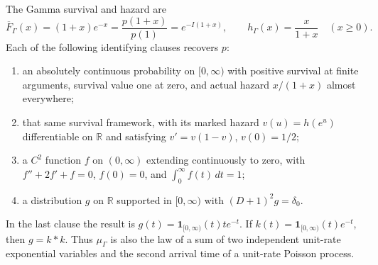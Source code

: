 \begin{theorem}
\label{final:P5}
The Gamma survival and hazard are
\begin{equation}
 \overline F_\Gamma(x)=(1+x)e^{-x}
 =\frac{p(1+x)}{p(1)}=e^{-I(1+x)},\qquad
 h_\Gamma(x)=\frac{x}{1+x}\quad(x\geq0).
 \label{final:eq-survival}
\end{equation}
Each of the following identifying clauses recovers $p$:
\begin{enumerate}
\item an absolutely continuous probability on $[0,\infty)$ with
      positive survival at finite arguments, survival value one at
      zero, and actual hazard $x/(1+x)$ almost everywhere;
\item that same survival framework, with its marked hazard
      $v(u)=h(e^u)$ differentiable on $\mathbb R$ and satisfying
      $v'=v(1-v)$, $v(0)=1/2$;
\item a $C^2$ function $f$ on $(0,\infty)$ extending continuously
      to zero, with $f''+2f'+f=0$, $f(0)=0$, and
      $\int_0^\infty f(t)\,dt=1$;
\item a distribution $g$ on $\mathbb R$ supported in $[0,\infty)$
      with $(D+1)^2g=\delta_0$.
\end{enumerate}
In the last clause the result is
$g(t)=\mathbf 1_{[0,\infty)}(t)t e^{-t}$.
If $k(t)=\mathbf 1_{[0,\infty)}(t)e^{-t}$, then $g=k*k$.
Thus $\mu_\Gamma$ is also the law of a sum of two independent
unit-rate exponential variables and the second arrival time of a
unit-rate Poisson process.
\end{theorem}
